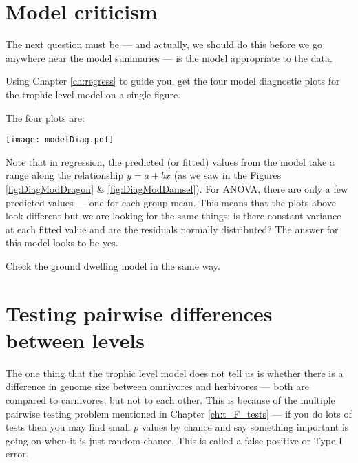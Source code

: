 \section{Model criticism}

The next question must be  ---  and actually, we should do this before 
we go anywhere near the model summaries --- is the model appropriate to 
the data.

\begin{compactitem}[$\quad\star$]
	\item Using Chapter \ref{ch:regress} to guide you, get the four model 
	diagnostic plots for the trophic level model on a single figure.
\end{compactitem}

The four plots are:
\begin{center}
	\texttt{[image: modelDiag.pdf]}	
\end{center}

Note that in regression, the predicted (or fitted) values from the 
model take a range along the relationship $y=a + bx$ (as we saw in the 
Figures \ref{fig:DiagModDragon} \& \ref{fig:DiagModDamsel}). For ANOVA, 
there are only a few predicted values --- one for each group mean. This 
means that the plots above look different but we are looking for the 
same things: is there constant variance at each fitted value and are 
the residuals normally distributed? The answer for this model looks to 
be yes.

\begin{compactitem}[$\quad\star$]
	\item Check the ground dwelling model in the same way.
\end{compactitem}
 
\section{Testing pairwise differences between levels}

The one thing that the trophic level model does not tell us is whether 
there is a difference in genome size between omnivores and herbivores 
--- both are compared to carnivores, but not to each other. This is 
because of the multiple pairwise testing problem mentioned in Chapter 
\ref{ch:t_F_tests} --- if you do 
lots of tests then you may find small $p$ values by chance and say 
something important is going on when it is just random chance. This is 
called a false positive or Type I error.
 
